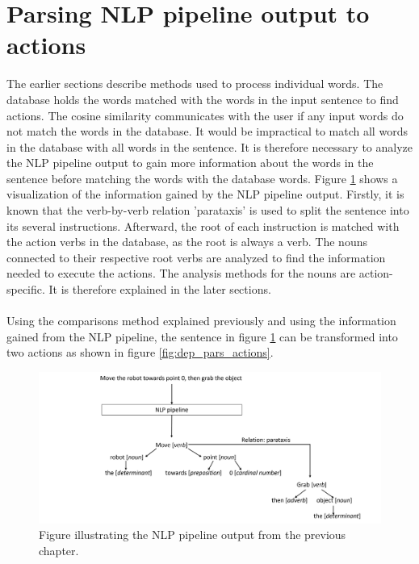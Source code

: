 \section{Parsing NLP pipeline output to actions} \label{sec:decon}
The earlier sections describe methods used to process individual words. The database holds the words matched with the words in the input sentence to find actions. The cosine similarity communicates with the user if any input words do not match the words in the database. It would be impractical to match all words in the database with all words in the sentence. It is therefore necessary to analyze the NLP pipeline output to gain more information about the words in the sentence before matching the words with the database words.
Figure \ref{fig:dep_pars_Parser} shows a visualization of the information gained by the NLP pipeline output. Firstly, it is known that the verb-by-verb relation 'parataxis' is used to split the sentence into its several instructions. Afterward, the root of each instruction is matched with the action verbs in the database, as the root is always a verb. The nouns connected to their respective root verbs are analyzed to find the information needed to execute the actions. The analysis methods for the nouns are action-specific. It is therefore explained in the later sections.
\\\\
Using the comparisons method explained previously and using the information gained from the NLP pipeline, the sentence in figure \ref{fig:dep_pars_Parser} can be transformed into two actions as shown in figure \ref{fig:dep_pars_actions}.


\begin{figure}[ht]
    \centering
    \includegraphics[width=14cm]{img/NLP_pipeline_output.png}
    \caption{Figure illustrating the NLP pipeline output from the previous chapter.}
    \label{fig:dep_pars_Parser}
\end{figure}

